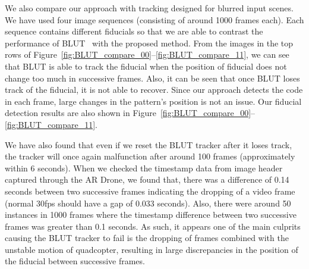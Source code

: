 We also compare our approach with tracking designed for blurred input
scenes.  We have used four image sequences (consisting of around 1000
frames each). Each sequence contains different fiducials so that we
are able to contrast the performance of BLUT~\cite{Wu:2011} with the
proposed method.  From the images in the top rows of
Figure~\ref{fig:BLUT_compare_00}--\ref{fig:BLUT_compare_11},
we can see that BLUT is able to track the fiducial when the position
of fiducial does not change too much in successive frames. Also, it
can be seen that once BLUT loses track of the fiducial, it is not
able to recover. Since our approach detects the code in each frame,
large changes in the pattern's position is not an issue.  Our fiducial
detection results are also shown in
Figure~\ref{fig:BLUT_compare_00}--\ref{fig:BLUT_compare_11}.

We have also found that even if we reset the BLUT tracker after it
loses track, the tracker will once again malfunction after around 100
frames (approximately within 6 seconds). When we checked the timestamp
data from image header captured through the AR Drone, we found that,
there was a difference of 0.14 seconds between two successive frames
indicating the dropping of a video frame (normal 30fps should have a gap
of 0.033 seconds). Also, there were around 50 instances in 1000 frames
where the timestamp difference between two successive frames was
greater than 0.1 seconds. As such, it appears one of the main culprits
causing the BLUT tracker to fail is the dropping of frames combined
with the unstable motion of quadcopter, resulting in large discrepancies in
the  position of the fiducial between successive frames.

